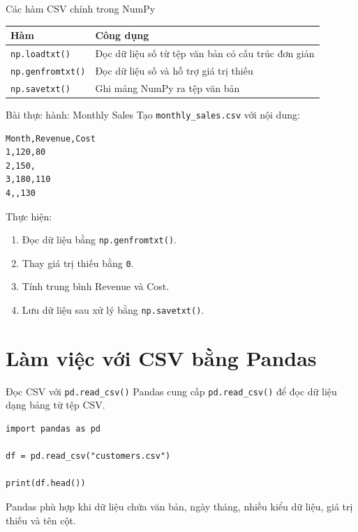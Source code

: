 \documentclass[aspectratio=169,11pt]{beamer}
\newcommand{\code}[1]{\texttt{#1}}
\begin{document}
\begin{frame}{Các hàm CSV chính trong NumPy}
\begin{tabularx}{\textwidth}{lX}
\toprule
\textbf{Hàm} & \textbf{Công dụng} \\
\midrule
\code{np.loadtxt()} & Đọc dữ liệu số từ tệp văn bản có cấu trúc đơn giản \\
\code{np.genfromtxt()} & Đọc dữ liệu số và hỗ trợ giá trị thiếu \\
\code{np.savetxt()} & Ghi mảng NumPy ra tệp văn bản \\
\bottomrule
\end{tabularx}
\end{frame}

\begin{frame}[fragile]{Bài thực hành: Monthly Sales}
Tạo \code{monthly\_sales.csv} với nội dung:
\begin{lstlisting}[style=textstyle]
Month,Revenue,Cost
1,120,80
2,150,
3,180,110
4,,130
\end{lstlisting}

Thực hiện:
\begin{enumerate}
  \item Đọc dữ liệu bằng \code{np.genfromtxt()}.
  \item Thay giá trị thiếu bằng \code{0}.
  \item Tính trung bình Revenue và Cost.
  \item Lưu dữ liệu sau xử lý bằng \code{np.savetxt()}.
\end{enumerate}
\end{frame}

\section{Làm việc với CSV bằng Pandas}

\begin{frame}[fragile]{Đọc CSV với \code{pd.read\_csv()}}
Pandas cung cấp \code{pd.read\_csv()} để đọc dữ liệu dạng bảng từ tệp CSV.

\begin{lstlisting}[style=pythonstyle]
import pandas as pd

df = pd.read_csv("customers.csv")

print(df.head())
\end{lstlisting}

Pandas phù hợp khi dữ liệu chứa văn bản, ngày tháng, nhiều kiểu dữ liệu, giá trị thiếu và tên cột.
\end{frame}
\end{document}
